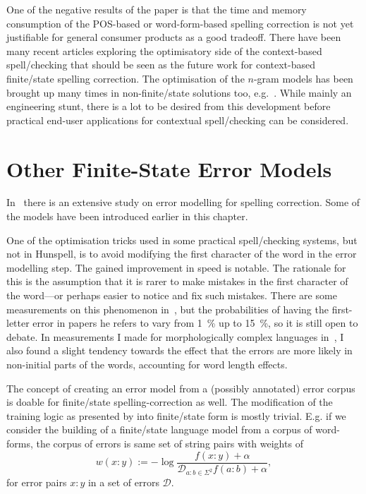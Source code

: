 \documentclass[officiallayout]{unihelcompling}
\begin{document}
One of the negative results of the paper is that the time and memory
consumption of the POS-based or word-form-based spelling correction is not yet
justifiable for general consumer products as a good tradeoff. There have been
many recent articles exploring the optimisatory side of the context-based
spell\-/checking that should be seen as the future work for context-based
finite\-/state spelling correction. The optimisation of the \(n\)-gram models has
been brought up many times in non-finite\-/state solutions too,
e.g.~\citet{church2007compressing}. While mainly an engineering stunt, there is
a lot to be desired from this development before practical end-user
applications for contextual spell\-/checking can be considered.

\section{Other Finite-State Error Models}
\label{sec:other-errors}

In~\citet{deorowicz2005correcting} there is an extensive study on error
modelling for spelling correction. Some of the models have been
introduced earlier in this chapter.

One of the optimisation tricks used in some practical spell\-/checking systems,
but not in Hunspell, is to avoid modifying the first character of the word in
the error modelling step. The gained improvement in speed is notable. The
rationale for this is the assumption that it is rarer to make mistakes in the
first character of the word---or perhaps easier to notice and fix such
mistakes. There are some measurements on this phenomenon
in~\citet{bhagat2007spelling}, but the probabilities of having the first-letter
error in papers he refers to vary from 1~\% up to 15~\%, so it is still open to
debate. In measurements I made for morphologically complex languages
in~, I also found a slight tendency towards
the effect that the errors are more likely in non-initial parts of the words,
accounting for word length effects.

The concept of creating an error model from a (possibly annotated) error corpus
is doable for finite\-/state spelling-correction as well. The modification of
the training logic as presented by \citep{church1991probability} into
finite\-/state form is mostly trivial. E.g. if we consider the building of a
finite\-/state language model from a corpus of word-forms, the corpus of errors
is same set of string pairs with weights of 
\begin{equation}
    w(x:y) := -\log\frac{f(x:y) + \alpha}{\mathcal{D}_{a:b \in \Sigma^2} f(a:b) + \alpha},
\end{equation}
for error pairs $x:y$ in a set of errors $\mathcal{D}$.
\end{document}
